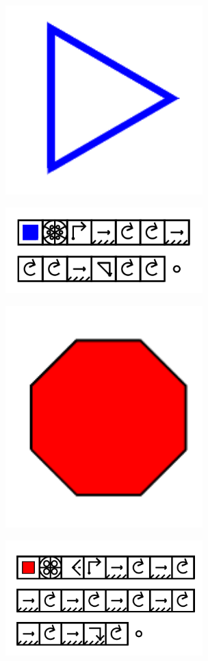 \documentclass[11pt]{article}
\begin{document}
\includegraphics[width=3in]{image31.png}

\includegraphics[width=3in]{image32.png}

\includegraphics[width=3in]{image33.png}

\includegraphics[width=3in]{image34.png}
\end{document}
